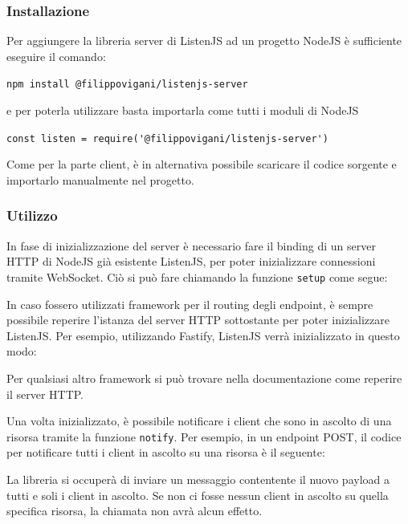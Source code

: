 \documentclass[12pt,a4paper,openright,twoside]{report}
\begin{document}
\subsubsection{Installazione}
Per aggiungere la libreria server di ListenJS ad un progetto NodeJS è sufficiente eseguire il comando:
\begin{center}
\lstinline{npm install @filippovigani/listenjs-server}
\end{center}
e per poterla utilizzare basta importarla come tutti i moduli di NodeJS
\begin{center}
\lstinline{const listen = require('@filippovigani/listenjs-server')}
\end{center}
Come per la parte client, è in alternativa possibile scaricare il codice sorgente\cite{listenjs_server_repo} e importarlo manualmente nel progetto.

\subsubsection{Utilizzo}
In fase di inizializzazione del server è necessario fare il binding di un server HTTP di NodeJS già esistente ListenJS, per poter inizializzare connessioni tramite WebSocket. Ciò si può fare chiamando la funzione \lstinline{setup} come segue: 

In caso fossero utilizzati framework per il routing degli endpoint, è sempre possibile reperire l'istanza del server HTTP sottostante per poter inizializzare ListenJS. Per esempio, utilizzando Fastify, ListenJS verrà inizializzato in questo modo:

Per qualsiasi altro framework si può trovare nella documentazione come reperire il server HTTP.

\bigskip

Una volta inizializzato, è possibile notificare i client che sono in ascolto di una risorsa tramite la funzione \lstinline{notify}. Per esempio, in un endpoint POST, il codice per notificare tutti i client in ascolto su una risorsa è il seguente:


La libreria si occuperà di inviare un messaggio contentente il nuovo payload a tutti e soli i client in ascolto. Se non ci fosse nessun client in ascolto su quella specifica risorsa, la chiamata non avrà alcun effetto.

\end{document}
